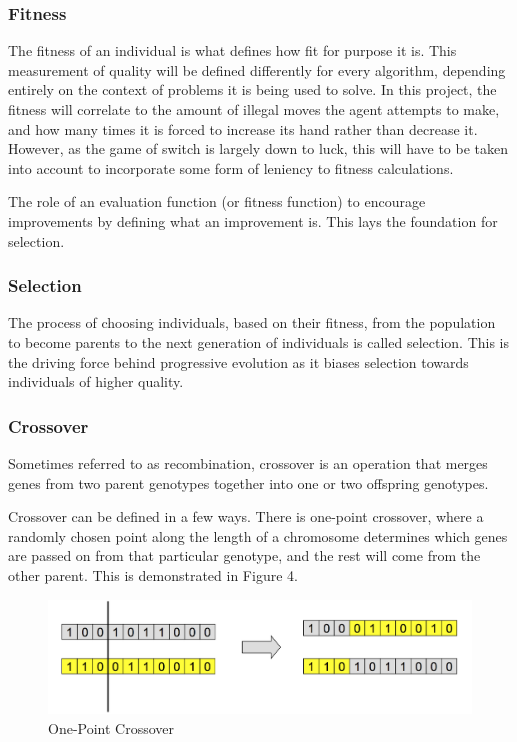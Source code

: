 \documentclass[12pt,a4paper]{article}
\begin{document}
\subsubsection{Fitness}
The fitness of an individual is what defines how fit for purpose it is. This measurement of quality will be defined differently for every algorithm, depending entirely on the context of problems it is being used to solve. In this project, the fitness will correlate to the amount of illegal moves the agent attempts to make, and how many times it is forced to increase its hand rather than decrease it. However, as the game of switch is largely down to luck, this will have to be taken into account to incorporate some form of leniency to fitness calculations.  

The role of an evaluation function (or fitness function) to encourage improvements by defining what an improvement is\citep{IntroductionToEvolutionaryComputing}. This lays the foundation for selection. 

\subsubsection{Selection}
The process of choosing individuals, based on their fitness, from the population to become parents to the next generation of individuals is called selection\citep{IntroductionToEvolutionaryComputing}. This is the driving force behind progressive evolution as it biases selection towards individuals of higher quality. 

\subsubsection{Crossover}
Sometimes referred to as recombination, crossover is an operation that merges genes from two parent genotypes together into one or two offspring genotypes\citep{IntroductionToEvolutionaryComputing}. 

Crossover can be defined in a few ways. There is one-point crossover, where a randomly chosen point along the length of a chromosome determines which genes are passed on from that particular genotype, and the rest will come from the other parent. This is demonstrated in Figure 4.

\begin{figure}[h]
	\centering
	\includegraphics[width = \textwidth]{OnePointCrossover.png}
	\caption{One-Point Crossover}
\end{figure}
\end{document}
